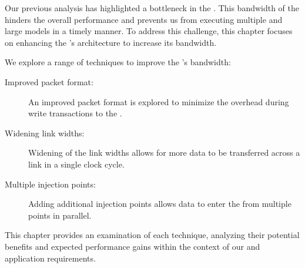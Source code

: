 

Our previous analysis has highlighted a bottleneck in the \confignoc{}.
This bandwidth of the \confignoc{} hinders the overall performance and prevents us from executing multiple and large models in a timely manner.
To address this challenge, this chapter focuses on enhancing the \confignoc{}'s architecture to increase its bandwidth.

We explore a range of techniques to improve the \confignoc{}'s bandwidth:
\begin{description}
    \item[Improved packet format:]
    An improved packet format is explored to minimize the overhead during write transactions to the \graicore{}.
    \item[Widening link widths:]
    Widening of the link widths allows for more data to be transferred across a link in a single clock cycle.
    \item[Multiple injection points:]
    Adding additional injection points allows data to enter the \confignoc{} from multiple points in parallel.
\end{description}

This chapter provides an examination of each technique, analyzing their potential benefits and expected performance gains within the context of our \confignoc{} and application requirements.

